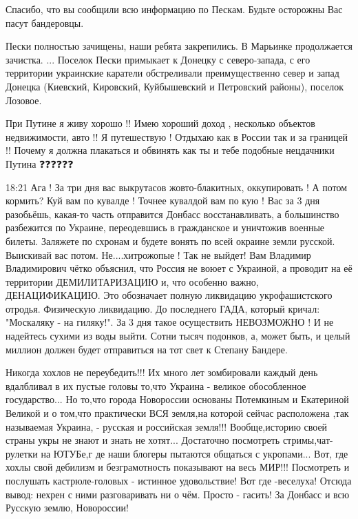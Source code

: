 
Спасибо, что вы сообщили всю информацию по Пескам. Будьте осторожны Вас пасут бандеровцы.

Пески полностью зачищены, наши ребята закрепились. В Марьинке продолжается
зачистка. ... Поселок Пески примыкает к Донецку с северо-запада, с его
территории украинские каратели обстреливали преимущественно север и запад
Донецка (Киевский, Кировский, Куйбышевский и Петровский районы), поселок
Лозовое.

При Путине я живу хорошо !! Имею хороший доход , несколько объектов
недвижимости, авто !! Я путешествую ! Отдыхаю как в России так и за границей !!
Почему я должна плакаться и обвинять как ты и тебе подобные нецдачники Путина
❓❓❓❓❓❓

18:21
Ага ! За три дня вас выкрутасов жовто-блакитных, оккупировать !
А потом кормить? Куй вам по кувалде ! Точнее кувалдой вам по кую !
Вас за 3 дня разобьёшь, какая-то часть
отправится Донбасс восстанавливать, а большинство разбежится по Украине,
переодевшись в гражданское и уничтожив военные билеты.
Заляжете по схронам и будете вонять по всей окраине земли русской.
Выискивай вас потом.
Не....хитрожопые ! Так не выйдет!
Вам Владимир Владимирович чётко объяснил, что Россия не воюет с Украиной, а проводит
на её территории ДЕМИЛИТАРИЗАЦИЮ и, что особенно важно, ДЕНАЦИФИКАЦИЮ.
Это обозначает полную ликвидацию укрофашистского отродья. Физическую ликвидацию. До
последнего ГАДА, который кричал: "Москаляку - на гиляку!".
За 3 дня такое осуществить НЕВОЗМОЖНО ! И не надейтесь сухими из воды выйти.
Сотни тысяч подонков, а, может быть, и целый миллион должен будет отправиться на тот свет к
Степану Бандере.


Никогда хохлов не переубедить!!! Их много лет зомбировали каждый день
вдалбливал в их пустые головы то,что Украина - великое обособленное
государство... Но то,что города Новороссии основаны Потемкиным и Екатериной
Великой и о том,что практически ВСЯ земля,на которой сейчас расположена ,так
называемая Украина, - русская и российская земля!!! Вообще,историю своей страны
укры не знают и знать не хотят... Достаточно посмотреть стримы,чат- рулетки на
ЮТУБе,г де наши блогеры пытаются общаться с укропами... Вот, где хохлы свой
дебилизм и безграмотность показывают на весь МИР!!! Посмотреть и послушать
кастрюле-головых - истинное удовольствие! Вот где -веселуха! Отсюда вывод:
нехрен с ними разговаривать ни о чём. Просто - гасить! За Донбасс и всю Русскую
землю, Новороссии!

